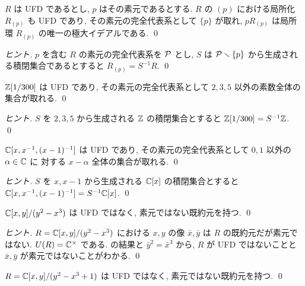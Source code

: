 \documentclass[12pt,twoside]{jarticle}
\begin{document}
\begin{question}
 $R$ は UFD であるとし, $p$ はその素元であるとする.
 $R$ の $(p)$ における局所化 $R_{(p)}$ も UFD であり, 
 その素元の完全代表系として $\{p\}$ が取れ, 
 $pR_{(p)}$ は局所環 $R_{(p)}$ の唯一の極大イデアルである.
 \qed
\end{question}

\begin{proof}[ヒント]
 $p$ を含む $R$ の素元の完全代表系を ${\mathcal P}$ とし, %
 $S$ は ${\mathcal P}\smallsetminus\{p\}$ から生成される積閉集合であるとすると %
 $R_{(p)}=S^{-1}R$.
 \qed
\end{proof}

\begin{question}
 ${\mathbb Z}[1/300]$ は UFD であり, 
 その素元の完全代表系として $2,3,5$ 以外の素数全体の集合が取れる.
 \qed
\end{question}

\begin{proof}[ヒント]
 $S$ を $2,3,5$ から生成される ${\mathbb Z}$ の積閉集合とすると %
 ${\mathbb Z}[1/300]=S^{-1}{\mathbb Z}$.
 \qed
\end{proof}

\begin{question}
 ${\mathbb C}[x,x^{-1},(x-1)^{-1}]$ は UFD であり, 
 その素元の完全代表系として $0,1$ 以外の $\alpha\in{\mathbb C}$ に
 対する $x-\alpha$ 全体の集合が取れる.
 \qed
\end{question}

\begin{proof}[ヒント]
 $S$ を $x,x-1$ から生成される ${\mathbb C}[x]$ の積閉集合とすると %
 ${\mathbb C}[x,x^{-1},(x-1)^{-1}]=S^{-1}{\mathbb C}[x]$.
 \qed
\end{proof}

\begin{question}[カスプ]
 \label{q:cusp-notUFD-irred-notprime}
 ${\mathbb C}[x,y]/(y^2-x^3)$ は UFD ではなく, 素元ではない既約元を持つ. \qed
\end{question}

\begin{proof}[ヒント]
 $R={\mathbb C}[x,y]/(y^2-x^3)$ における $x,y$ の像 $\bar{x},\bar{y}$ 
 は $R$ の既約元だが素元ではない. $U(R)={\mathbb C}^\times$ である.
  の結果と $\bar{y}^2=\bar{x}^3$ から, %
 $R$ が UFD ではないことと $\bar{x},\bar{y}$ が素元ではないことがわかる.
 \qed
\end{proof}

\begin{question}[楕円曲線]
 \label{q:C[x,y]/(y^2-x^3+1)}
 $R={\mathbb C}[x,y]/(y^2-x^3+1)$ は UFD ではなく, 素元ではない既約元を持つ. 
 \qed
\end{question}
\end{document}

